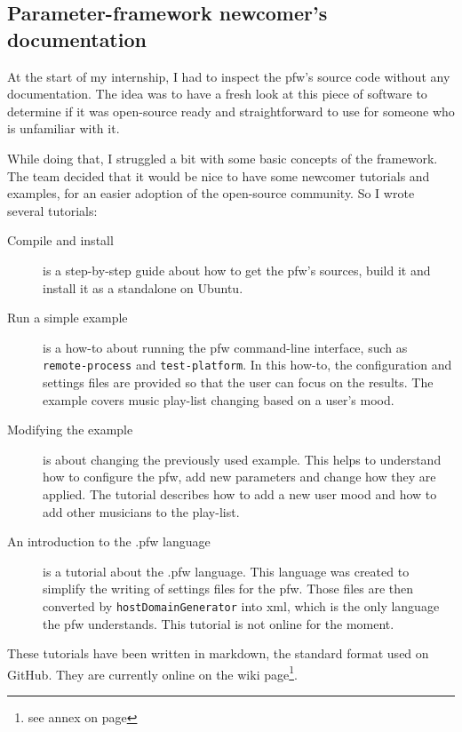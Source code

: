 \subsection{Parameter-framework newcomer's documentation}\label{sec:tutorials}

At the start of my internship, I had to inspect the \gls{pfw}'s
source code without any documentation. The idea was to have a fresh look at
this piece of software to determine if it was open-source ready and straightforward
to use for someone who is unfamiliar with it.

While doing that, I struggled a bit with some basic concepts of the framework. The
team decided that it would be nice to have some newcomer tutorials and examples,
for an easier adoption of the open-source community. So I wrote several
tutorials:
\begin{description}
    \item[Compile and install]
        is a step-by-step guide about how to get the \gls{pfw}'s sources,
        build it and install it as a standalone on Ubuntu.
    \item[Run a simple example]
        is a how-to about running the \gls{pfw} command-line interface,
        such as \lstinline{remote-process} and \lstinline {test-platform}.  In
        this how-to, the configuration and settings files are provided so that
        the user can focus on the results. The example covers music play-list
        changing based on a user's mood.
    \item[Modifying the example]
        is about changing the previously used example. This helps to understand
        how to configure the \gls{pfw}, add new parameters and change how they are applied.
        The tutorial describes how to add a new user mood and how to add other musicians to
        the play-list.
    \item[An introduction to the .pfw language]\label{desc:pfw-language}
        is a tutorial about the .pfw language. This language was
        created to simplify the writing of settings files for the
        \gls{pfw}. Those files are then converted by \lstinline{hostDomainGenerator} into \gls{xml}, which is
        the only language the \gls{pfw} understands. This tutorial is not online for the moment.
\end{description}
These tutorials have been written in \gls{markdown}, the standard format used
on \gls{GitHub}.
They are currently online on the wiki page\footnote{see annex on page \pageref{chap:annex}}.

